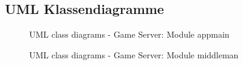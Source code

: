\documentclass[11pt,ngerman]{article}
\begin{document}
        \subsection{UML Klassendiagramme}
            \begin{figure}[H]
                \centering
                \caption{UML class diagrams - Game Server: Module appmain}
                \label{fig:UMLclassdiagram_Moduleappmain}
            \end{figure}
            \begin{figure}[H]
                \centering
                \caption{UML class diagrams - Game Server: Module middleman}
                \label{fig:UMLclassdiagram_Modulemiddleman}
            \end{figure}
            \newpage
\end{document}
